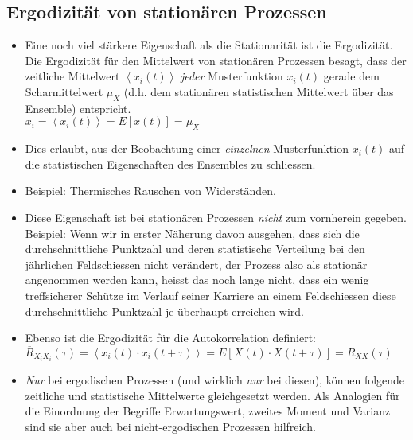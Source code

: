 \documentclass[10pt, a4paper]{article}
\begin{document}
\subsection{Ergodizit\"at von station\"aren Prozessen}
\begin{itemize}
  \item Eine noch viel st\"arkere Eigenschaft als die Stationarit\"at ist die Ergodizit\"at. Die
        Ergodizit\"at f\"ur den Mittelwert von station\"aren Prozessen besagt,
         dass der zeitliche Mittelwert $\left\langle x_{i}(t) \right\rangle$
         \textit{jeder} Musterfunktion $x_{i}(t)$ gerade dem Scharmittelwert $\mu_{X}$
        (d.h. dem station\"aren statistischen Mittelwert \"uber das Ensemble) entspricht. \\
        $\overline{x_{i}} = \left\langle x_{i}(t) \right\rangle = E[x(t)] = \mu_{X}$
  \item Dies erlaubt, aus der Beobachtung einer \textit{einzelnen} Musterfunktion $x_{i}(t)$ auf die
        statistischen Eigenschaften des Ensembles zu schliessen.
  \item Beispiel: Thermisches Rauschen von Widerst\"anden.
  \item Diese Eigenschaft ist bei station\"aren Prozessen \textit{nicht}
        zum vornherein gegeben. Beispiel: Wenn
        wir in erster N\"aherung davon ausgehen, dass sich die durchschnittliche Punktzahl und deren
        statistische Verteilung bei den j\"ahrlichen Feldschiessen nicht ver\"andert, der Prozess
        also als station\"ar angenommen werden kann, heisst das noch lange nicht, dass ein wenig
        treffsicherer Sch\"utze im Verlauf seiner Karriere an einem Feldschiessen diese 
        durchschnittliche Punktzahl je \"uberhaupt erreichen wird.
  \item Ebenso ist die Ergodizit\"at f\"ur die Autokorrelation definiert: \\
        $\overline{R}_{X_{i}X_{i}}(\tau) = \left\langle x_{i}(t) \cdot x_{i}(t+\tau) \right\rangle =
                                   E[X(t)\cdot X(t+\tau)] = R_{XX}(\tau)$
  \item \textit{Nur} bei ergodischen Prozessen (und wirklich \textit{nur} bei diesen), k\"onnen
        folgende zeitliche und statistische Mittelwerte gleichgesetzt werden. Als Analogien
        f\"ur die Einordnung der Begriffe Erwartungswert,
        zweites Moment und Varianz sind sie aber auch bei nicht-ergodischen
        Prozessen hilfreich. \\ \\
        \begin{tabular}{ll}

\end{tabular}
\end{itemize}
\end{document}
